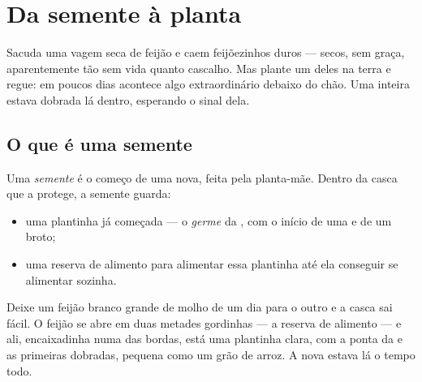 \chapter{Da semente à planta}\label{ch:g2:from-seed-to-plant}

Sacuda uma vagem seca de feijão e caem feijõezinhos duros --- secos,
sem graça, aparentemente tão sem vida quanto cascalho. Mas plante um
deles na terra e regue: em poucos dias acontece algo extraordinário
debaixo do chão. Uma  inteira estava dobrada lá dentro,
esperando o sinal dela.

\section{O que é uma semente}

\begin{definition}[Semente]\label{def:g2:from-seed-to-plant:seed}
Uma \emph{semente} é o começo de uma  nova,
feita pela planta-mãe. Dentro da casca que a protege, a semente
guarda:
\begin{itemize}
  \item uma plantinha já começada --- o \emph{germe}
da , com o início de uma  e de um broto;
  \item uma reserva de alimento para alimentar essa plantinha até
        ela conseguir se alimentar sozinha.
\end{itemize}
\end{definition}

\begin{example}\label{ex:g2:from-seed-to-plant:open}
Deixe um feijão branco grande de molho de um dia para o outro e a
casca sai fácil. O feijão se abre em duas metades gordinhas --- a
reserva de alimento --- e ali, encaixadinha numa das bordas, está
uma plantinha clara, com a ponta da  e as primeiras 
dobradas, pequena como um grão de arroz. A  nova estava lá o
tempo todo.
\end{example}

